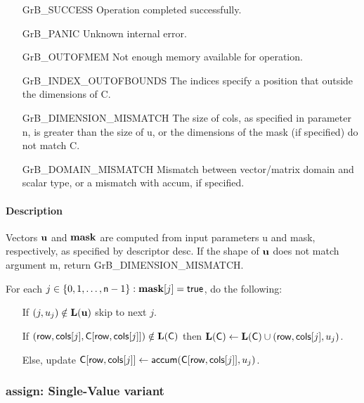 \begin{itemize}[leftmargin=2.1in]
\item[{\sf GrB\_SUCCESS}]             Operation completed successfully.
\item[{\sf GrB\_PANIC}]               Unknown internal error.
\item[{\sf GrB\_OUTOFMEM}]            Not enough memory available for operation.
\item[{\sf GrB\_INDEX\_OUTOFBOUNDS}]  The indices specify a position that outside the dimensions of {\sf C}.
\item[{\sf GrB\_DIMENSION\_MISMATCH}] 
        The size of {\sf cols}, as specified in parameter {\sf n}, is greater than the size of {\sf u}, or
        the dimensions of the mask (if specified) do not match {\sf C}.
\item[{\sf GrB\_DOMAIN\_MISMATCH}]    Mismatch between vector/matrix domain and scalar type,
                                      or a mismatch with {\sf accum}, if specified.
\end{itemize}

\paragraph{Description}

Vectors ${\bf u}$ and ${\bf mask}$ are computed from input parameters {\sf u} and {\sf mask}, respectively,
as specified by descriptor {\sf desc}. If the shape of ${\bf u}$ does not match argument {\sf m},
return {\sf GrB\_DIMENSION\_MISMATCH}.

For each $j \in \{0, 1, \ldots, {\sf n}-1 \} : {\bf mask}[j] = {\sf true}$, do the following:
\begin{itemize}
	\item[] If $(j,u_{j}) \notin \bold{L}({\bf u})$ skip to next $j$.
	\item[] If $({\sf row}, {\sf cols}[j], {\sf C}[{\sf row},{\sf cols}[j]]) \notin \bold{L}({\sf C})$ then
	      $\bold{L}({\sf C}) \leftarrow \bold{L}({\sf C}) \cup ({\sf row},{\sf cols}[j],u_{j})$.
	\item[]  Else, update ${\sf C}[{\sf row},{\sf cols}[j]] \leftarrow {\sf accum}({\sf C}[{\sf row},{\sf cols}[j]],u_{j})$.
\end{itemize}

\subsubsection{{\sf assign}: Single-Value variant}


